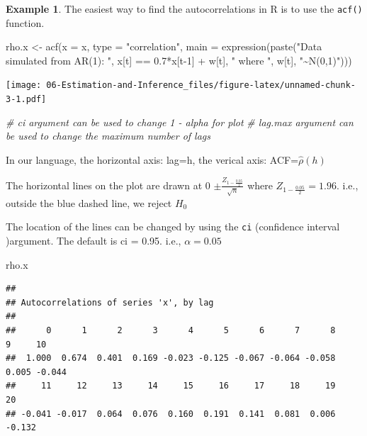 \documentclass[
]{book}
\newenvironment{Shaded}{\begin{snugshade}}{\end{snugshade}}
\newcommand{\AttributeTok}[1]{\textcolor[rgb]{0.77,0.63,0.00}{#1}}
\newcommand{\CommentTok}[1]{\textcolor[rgb]{0.56,0.35,0.01}{\textit{#1}}}
\newcommand{\DecValTok}[1]{\textcolor[rgb]{0.00,0.00,0.81}{#1}}
\newcommand{\FloatTok}[1]{\textcolor[rgb]{0.00,0.00,0.81}{#1}}
\newcommand{\FunctionTok}[1]{\textcolor[rgb]{0.00,0.00,0.00}{#1}}
\newcommand{\NormalTok}[1]{#1}
\newcommand{\OtherTok}[1]{\textcolor[rgb]{0.56,0.35,0.01}{#1}}
\newcommand{\SpecialCharTok}[1]{\textcolor[rgb]{0.00,0.00,0.00}{#1}}
\newcommand{\StringTok}[1]{\textcolor[rgb]{0.31,0.60,0.02}{#1}}
\theoremstyle{definition}
\theoremstyle{definition}
\newtheorem{example}{Example}[chapter]
\theoremstyle{definition}
\theoremstyle{definition}
\theoremstyle{remark}
\begin{document}
\begin{example}
The easiest way to find the autocorrelations in R is to use the \texttt{acf()} function.

\begin{Shaded}
\begin{Highlighting}[]
\NormalTok{rho.x }\OtherTok{\textless{}{-}} \FunctionTok{acf}\NormalTok{(}\AttributeTok{x =}\NormalTok{ x, }\AttributeTok{type =} \StringTok{"correlation"}\NormalTok{, }\AttributeTok{main =}
             \FunctionTok{expression}\NormalTok{(}\FunctionTok{paste}\NormalTok{(}\StringTok{"Data simulated from AR(1): "}\NormalTok{, x[t] }\SpecialCharTok{==} \FloatTok{0.7}\SpecialCharTok{*}\NormalTok{x[t}\DecValTok{{-}1}\NormalTok{] }\SpecialCharTok{+}\NormalTok{ w[t], }\StringTok{" where "}\NormalTok{, w[t], }\StringTok{"\textasciitilde{}N(0,1)"}\NormalTok{)))}
\end{Highlighting}
\end{Shaded}

\texttt{[image: 06-Estimation-and-Inference\_files/figure-latex/unnamed-chunk-3-1.pdf]}

\begin{Shaded}
\begin{Highlighting}[]
  \CommentTok{\# ci argument can be used to change 1 {-} alpha for plot}
  \CommentTok{\# lag.max argument can be used to change the maximum number of lags}
\end{Highlighting}
\end{Shaded}

In our language, the horizontal axis: lag=h, the verical axis: ACF=\(\hat{\rho}(h)\)

The horizontal lines on the plot are drawn at 0 \(\pm \frac{Z_{1-\frac{0.05}{2}}}{\sqrt{n}}\) where \(Z_{1-\frac{0.05}{2}} = 1.96\).
i.e., outside the blue dashed line, we reject \(H_0\)

The location of the lines can be changed by using the \texttt{ci} (confidence interval )argument. The default is ci = 0.95. i.e., \(\alpha=0.05\)

\begin{Shaded}
\begin{Highlighting}[]
\NormalTok{rho.x}
\end{Highlighting}
\end{Shaded}

\begin{verbatim}
## 
## Autocorrelations of series 'x', by lag
## 
##      0      1      2      3      4      5      6      7      8      9     10 
##  1.000  0.674  0.401  0.169 -0.023 -0.125 -0.067 -0.064 -0.058  0.005 -0.044 
##     11     12     13     14     15     16     17     18     19     20 
## -0.041 -0.017  0.064  0.076  0.160  0.191  0.141  0.081  0.006 -0.132
\end{verbatim}


\end{example}
\end{document}
